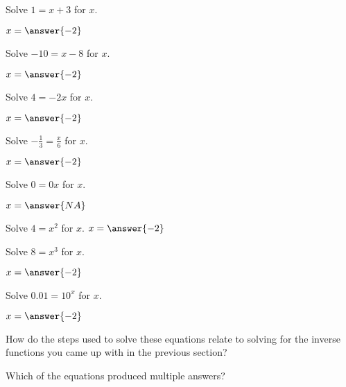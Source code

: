 \documentclass[number]{ximera}
\begin{document}
\begin{problem}
Solve $1=x+3$ for $x$.

$x=\answer{-2}$
\end{problem}

\begin{problem}
Solve $-10=x-8$ for $x$.

$x=\answer{-2}$
\end{problem}

\begin{problem}
Solve $4=-2x$ for $x$.

$x=\answer{-2}$
\end{problem}

\begin{problem}
Solve $-\frac{1}{3}=\frac{x}{6}$ for $x$.

$x=\answer{-2}$
\end{problem}

\begin{problem}
Solve $0=0x$ for $x$.

$x=\answer{NA}$
\end{problem}

\begin{problem}
Solve $4=x^2$ for $x$.
$x=\answer{-2}$
\end{problem}

\begin{problem}
Solve $8=x^3$ for $x$.

$x=\answer{-2}$
\end{problem}

\begin{problem}
Solve $0.01=10^x$ for $x$.

$x=\answer{-2}$
\end{problem}

\begin{question}
How do the steps used to solve these equations relate to solving for the inverse functions you came up with in the previous section?
\begin{freeResponse}

\end{freeResponse}
\end{question}

\begin{question}
Which of the equations produced multiple answers?
\begin{selectAll}
\end{selectAll}

\end{question}
\end{document}
